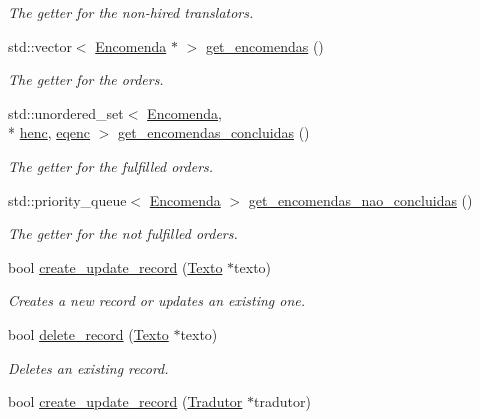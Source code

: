 \begin{DoxyCompactItemize}
\begin{DoxyCompactList}\small\item\em The getter for the non-\/hired translators. \end{DoxyCompactList}\item 
std\-::vector$<$ \hyperlink{class_encomenda}{Encomenda} $\ast$ $>$ \hyperlink{class_database_manager_a5c2b2ad77ee83de5b1fb2f07cdfc6736}{get\-\_\-encomendas} ()
\begin{DoxyCompactList}\small\item\em The getter for the orders. \end{DoxyCompactList}\item 
std\-::unordered\-\_\-set$<$ \hyperlink{class_encomenda}{Encomenda}, \\*
\hyperlink{structhenc}{henc}, \hyperlink{structeqenc}{eqenc} $>$ \hyperlink{class_database_manager_a7f87b90b9507e3782458c7767f29e90e}{get\-\_\-encomendas\-\_\-concluidas} ()
\begin{DoxyCompactList}\small\item\em The getter for the fulfilled orders. \end{DoxyCompactList}\item 
std\-::priority\-\_\-queue$<$ \hyperlink{class_encomenda}{Encomenda} $>$ \hyperlink{class_database_manager_a831d3c7ee70fe6a8ef4442409fa282ec}{get\-\_\-encomendas\-\_\-nao\-\_\-concluidas} ()
\begin{DoxyCompactList}\small\item\em The getter for the not fulfilled orders. \end{DoxyCompactList}\item 
bool \hyperlink{class_database_manager_a10e0b6e056bcc0b669e272b839ae92fe}{create\-\_\-update\-\_\-record} (\hyperlink{class_texto}{Texto} $\ast$texto)
\begin{DoxyCompactList}\small\item\em Creates a new record or updates an existing one. \end{DoxyCompactList}\item 
bool \hyperlink{class_database_manager_aedc255310da21463f3297f3333898605}{delete\-\_\-record} (\hyperlink{class_texto}{Texto} $\ast$texto)
\begin{DoxyCompactList}\small\item\em Deletes an existing record. \end{DoxyCompactList}\item 
bool \hyperlink{class_database_manager_a587389f45912fee630df72658a4d09b0}{create\-\_\-update\-\_\-record} (\hyperlink{class_tradutor}{Tradutor} $\ast$tradutor)

\end{DoxyCompactItemize}
